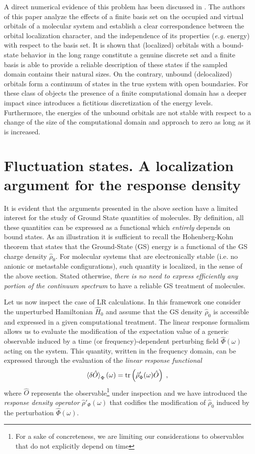 \documentclass[reprint,aps,prb]{revtex4-1}
\newcommand{\be}{\begin{equation}}
\newcommand{\ee}{\end{equation}}
\newcommand{\lb}{\label}
\newcommand{\op}[1]{\hat {#1}}
\newcommand{\trace}[1]{\mathrm{tr}\left(#1\right)}
\newcommand{\dmnot}{\op{\rho}_0}
\newcommand{\dm}{\op{\rho}}
\newcommand{\hnot}{\op{H}_0}
\begin{document}
A direct numerical evidence of this problem has been discussed in \cite{boffi2016}. The authors of this paper analyze the effects of a finite basis set on the 
occupied and virtual orbitals of a molecular system and establish a clear correspondence between the orbital localization character, and the independence of its properties (\emph{e.g.} energy) 
with respect to the basis set. It is shown that (localized) orbitals with a bound-state behavior in the long range constitute a genuine discrete set and a finite basis is 
able to provide a reliable description of these states if the sampled domain contains their natural sizes. On the contrary, unbound (delocalized) orbitals form a continuum of states in the 
true system with open boundaries. For these class of objects the presence of a finite computational domain has a deeper impact since introduces a fictitious discretization of the energy levels. 
Furthermore, the energies of the unbound orbitals are not stable with respect to a change of the size of the computational domain and approach to zero as long as it is increased.  


\section{Fluctuation states. A localization argument for the response density}
It is evident that the arguments presented in the above section have a limited interest for the study
of Ground State quantities of molecules. By definition, all these quantities can be expressed as a 
functional which \emph{entirely} depends on bound states. As an illustration it is sufficient to recall
the Hohenberg-Kohn theorem that states that the Ground-State (GS) energy is a functional of the GS
charge density $\dmnot$. For molecular systems that are electronically stable (i.e. no anionic or metastable configurations),
such quantity is localized, in the sense of the above section. Stated otherwise, 
\emph{there is no need to express efficiently any portion of the continuum spectrum} to have a reliable GS treatment of molecules.

Let us now inspect the case of LR calculations.
In this framework one consider the unperturbed Hamiltonian $\hnot$ and assume that 
the GS density $\dmnot$ is accessible and expressed in a given computational treatment. 
The linear response formalism allows us to evaluate the modification of the expectation value of a generic observable induced by a 
time (or frequency)-dependent perturbing field $\op\Phi(\omega)$ acting on the system. 
This quantity, written in the frequency domain, can be expressed through the evaluation of the \emph{linear response functional}
\be\lb{LinearResponseFunctDef1}
\braket{\delta\op O}_\Phi(\omega) = \trace{\dm'_\Phi(\omega)\op O} \;,
\ee
where $\op O$ represents the observable\footnote{For a sake of concreteness, we are limiting our considerations to observables that do not explicitly depend on time} under inspection 
and we have introduced the \emph{response density operator} $\dm'_\Phi(\omega)$ that codifies the modification of $\dmnot$ induced by the perturbation $\op\Phi(\omega)$. 
\end{document}

